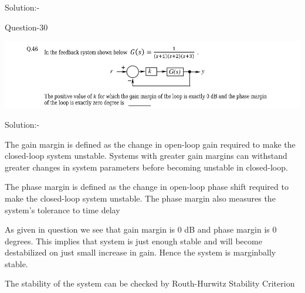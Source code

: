\documentclass[journal,12pt,twocolumn]{IEEEtran}
\begin{document}
\begin{frame}{Solution:- }
\begin{frame}{Question-30 }
\begin{block}
\includegraphics[scale=0.33]{./figs/1.png}

\end{block}
\end{frame}

\begin{frame}{Solution:- }

\begin{block}

The gain margin is defined as the change in open-loop gain required to make the closed-loop system unstable. Systems with greater gain margins can withstand greater changes in system parameters before becoming unstable in closed-loop. 

\end{block} \vspace{16pt}
\begin{block}

The phase margin is defined as the change in open-loop phase shift required to make the closed-loop system unstable. The phase margin also measures the system's tolerance to time delay
\end{block} \vspace{16pt}




\end{frame}



\begin{frame}{}
\begin{block}

As given in question we see that gain margin is 0 dB and phase margin is 0 degrees. This implies that system is just enough stable and will become destabilized on just small increase in gain. Hence the system is marginbally stable.
\end{block}

\begin{block}

The stability of the system can be checked by Routh-Hurwitz Stability Criterion 
\end{block}


\end{frame}
\end{frame}
\end{document}
